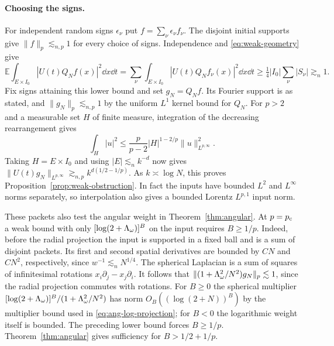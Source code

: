 \paragraph{Choosing the signs.}
For independent random signs $\epsilon_\nu$ put
$f=\sum_\nu\epsilon_\nu f_\nu$. The disjoint initial supports give
$\|f\|_p\lesssim_{n,p}1$ for every choice of signs. Independence and
\eqref{eq:weak-geometry} give
\[
 \mathbb E\int_{E\times I_0}|U(t)Q_N f(x)|^2\dd x\dd t
   =\sum_\nu\int_{E\times I_0}|U(t)Q_N f_\nu(x)|^2\dd x\dd t
   \ge \tfrac14|I_0|\sum_\nu|S_\nu|\gtrsim_n 1.
\]
Fix signs attaining this lower bound and set $g_N=Q_N f$.
Its Fourier support is as stated, and $\|g_N\|_p\lesssim_{n,p}1$ by
the uniform $L^1$ kernel bound for $Q_N$. For $p>2$ and a measurable
set $H$ of finite measure, integration of the decreasing rearrangement
gives
\[
  \int_H |u|^2\le \frac{p}{p-2}|H|^{1-2/p}\|u\|_{L^{p,\infty}}^2 .
\]
Taking $H=E\times I_0$ and using $|E|\lesssim_n k^{-d}$ now gives
$\|U(t)g_N\|_{L^{p,\infty}}\gtrsim_{n,p}k^{d(1/2-1/p)}$.
As $k\asymp\log N$, this proves Proposition~\ref{prop:weak-obstruction}.
In fact the inputs have bounded $L^2$ and $L^\infty$ norms separately,
so interpolation also gives a bounded Lorentz $L^{p,1}$ input norm.


These packets also test the angular weight in Theorem~\ref{thm:angular}.
At $p=p_{\mathrm c}$ a weak bound with only $[\log(2+\Lambda_\omega)]^B$ on the input
requires $B\ge 1/p$. Indeed, before the radial projection the input
is supported in a fixed ball and is a sum of disjoint packets. Its
first and second spatial derivatives are bounded by $C N$ and $C N^2$,
respectively, since $w^{-1}\lesssim_n N^{1/4}$. The spherical Laplacian
is a sum of squares of infinitesimal rotations $x_i\partial_j-x_j\partial_i$.
It follows that $\|(1+\Lambda_\omega^2/N^2)g_N\|_p\lesssim1$, since the radial
projection commutes with rotations. For $B\ge0$ the spherical multiplier
$[\log(2+\Lambda_\omega)]^B/(1+\Lambda_\omega^2/N^2)$ has norm
$O_B((\log(2+N))^B)$ by the multiplier bound used in
\eqref{eq:ang-log-projection}; for $B<0$ the logarithmic weight itself is
bounded. The preceding lower bound forces $B\ge1/p$. Theorem~\ref{thm:angular}
gives sufficiency for $B>1/2+1/p$.
